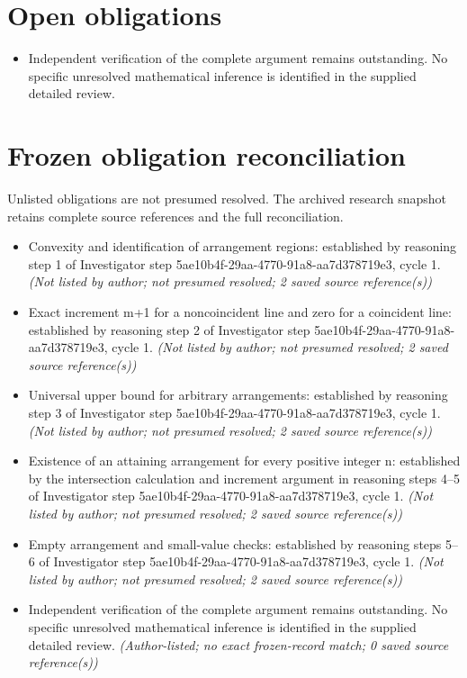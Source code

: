 \documentclass[11pt]{article}
\begin{document}
\section{Open obligations}
\begin{itemize}
\item Independent verification of the complete argument remains outstanding. No specific unresolved mathematical inference is identified in the supplied detailed review.
\end{itemize}
\section{Frozen obligation reconciliation}
Unlisted obligations are not presumed resolved. The archived research snapshot retains complete source references and the full reconciliation.
\begin{itemize}
\item Convexity and identification of arrangement regions: established by reasoning step 1 of Investigator step 5ae10b4f-29aa-4770-91a8-aa7d378719e3, cycle 1. \textit{ (Not listed by author; not presumed resolved; 2 saved source reference(s))}
\item Exact increment m+1 for a noncoincident line and zero for a coincident line: established by reasoning step 2 of Investigator step 5ae10b4f-29aa-4770-91a8-aa7d378719e3, cycle 1. \textit{ (Not listed by author; not presumed resolved; 2 saved source reference(s))}
\item Universal upper bound for arbitrary arrangements: established by reasoning step 3 of Investigator step 5ae10b4f-29aa-4770-91a8-aa7d378719e3, cycle 1. \textit{ (Not listed by author; not presumed resolved; 2 saved source reference(s))}
\item Existence of an attaining arrangement for every positive integer n: established by the intersection calculation and increment argument in reasoning steps 4–5 of Investigator step 5ae10b4f-29aa-4770-91a8-aa7d378719e3, cycle 1. \textit{ (Not listed by author; not presumed resolved; 2 saved source reference(s))}
\item Empty arrangement and small-value checks: established by reasoning steps 5–6 of Investigator step 5ae10b4f-29aa-4770-91a8-aa7d378719e3, cycle 1. \textit{ (Not listed by author; not presumed resolved; 2 saved source reference(s))}
\item Independent verification of the complete argument remains outstanding. No specific unresolved mathematical inference is identified in the supplied detailed review. \textit{ (Author-listed; no exact frozen-record match; 0 saved source reference(s))}
\end{itemize}
\end{document}
